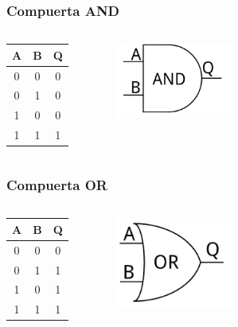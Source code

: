 \documentclass{beamer}
\begin{document}
\begin{frame}
\frametitle{Compuerta AND}
\begin{columns}[c]
\begin{center}
\begin{tabular}{cc|c}
A & B & Q \\ 
\hline 
0 & 0 & 0 \\  
0 & 1 & 0 \\  
1 & 0 & 0 \\ 
1 & 1 & 1 \\ 
\end{tabular} 
\end{center}
\begin{figure}[!h]
\centering
\includegraphics[width=1.5in]{and}
\end{figure}
\end{columns}
\end{frame}

\begin{frame}
\frametitle{Compuerta OR}
\begin{columns}[c]
\begin{center}
\begin{tabular}{cc|c}
A & B & Q \\ 
\hline 
0 & 0 & 0 \\  
0 & 1 & 1 \\  
1 & 0 & 1 \\ 
1 & 1 & 1 \\ 
\end{tabular} 
\end{center}
\begin{figure}[!h]
\centering
\includegraphics[width=1.5in]{or}
\end{figure}
\end{columns}
\end{frame}
\end{document}
